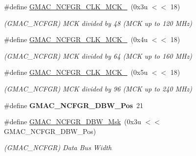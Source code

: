 \begin{DoxyCompactItemize}
\#define \mbox{\hyperlink{group__SAMV71__GMAC_gae867aa8a58afa86a0424e23e58c174c1}{G\+M\+A\+C\+\_\+\+N\+C\+F\+G\+R\+\_\+\+C\+L\+K\+\_\+\+M\+C\+K\+\_}}~(0x3u $<$$<$ 18)
\begin{DoxyCompactList}\small\item\em (G\+M\+A\+C\+\_\+\+N\+C\+F\+GR) M\+CK divided by 48 (M\+CK up to 120 M\+Hz) \end{DoxyCompactList}\item 
\mbox{\label{group__SAMV71__GMAC_gadc409f6fd40424194830af9921e1e638}} 
\#define \mbox{\hyperlink{group__SAMV71__GMAC_gadc409f6fd40424194830af9921e1e638}{G\+M\+A\+C\+\_\+\+N\+C\+F\+G\+R\+\_\+\+C\+L\+K\+\_\+\+M\+C\+K\+\_}}~(0x4u $<$$<$ 18)
\begin{DoxyCompactList}\small\item\em (G\+M\+A\+C\+\_\+\+N\+C\+F\+GR) M\+CK divided by 64 (M\+CK up to 160 M\+Hz) \end{DoxyCompactList}\item 
\mbox{\label{group__SAMV71__GMAC_gab3bb2d9e8af410ca93b12ae2b92eb403}} 
\#define \mbox{\hyperlink{group__SAMV71__GMAC_gab3bb2d9e8af410ca93b12ae2b92eb403}{G\+M\+A\+C\+\_\+\+N\+C\+F\+G\+R\+\_\+\+C\+L\+K\+\_\+\+M\+C\+K\+\_}}~(0x5u $<$$<$ 18)
\begin{DoxyCompactList}\small\item\em (G\+M\+A\+C\+\_\+\+N\+C\+F\+GR) M\+CK divided by 96 (M\+CK up to 240 M\+Hz) \end{DoxyCompactList}\item 
\mbox{\label{group__SAMV71__GMAC_ga325e14c2f2079edf60fce7e49438b4c6}} 
\#define {\bfseries G\+M\+A\+C\+\_\+\+N\+C\+F\+G\+R\+\_\+\+D\+B\+W\+\_\+\+Pos}~21
\item 
\mbox{\label{group__SAMV71__GMAC_ga22a3e61570b9c91999eee595eb80e7ea}} 
\#define \mbox{\hyperlink{group__SAMV71__GMAC_ga22a3e61570b9c91999eee595eb80e7ea}{G\+M\+A\+C\+\_\+\+N\+C\+F\+G\+R\+\_\+\+D\+B\+W\+\_\+\+Msk}}~(0x3u $<$$<$ G\+M\+A\+C\+\_\+\+N\+C\+F\+G\+R\+\_\+\+D\+B\+W\+\_\+\+Pos)
\begin{DoxyCompactList}\small\item\em (G\+M\+A\+C\+\_\+\+N\+C\+F\+GR) Data Bus Width \end{DoxyCompactList}\item 
\mbox{\label{group__SAMV71__GMAC_gaf435623facca34b4c13ac0dcd40207cb}} 

\end{DoxyCompactItemize}
